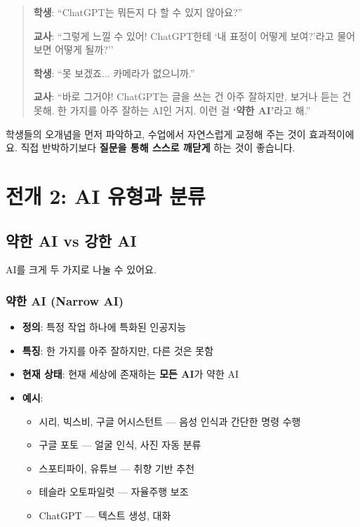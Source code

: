 \documentclass[11pt,a4paper]{article}
\begin{document}
\begin{quote}
 \textbf{학생}: ``ChatGPT는 뭐든지 다 할 수 있지 않아요?''

 \textbf{교사}: ``그렇게 느낄 수 있어! ChatGPT한테 `내 표정이 어떻게 보여?'라고 물어보면 어떻게 될까?''

 \textbf{학생}: ``못 보겠죠... 카메라가 없으니까.''

 \textbf{교사}: ``바로 그거야! ChatGPT는 글을 쓰는 건 아주 잘하지만, 보거나 듣는 건 못해. 한 가지를 아주 잘하는 AI인 거지. 이런 걸 \textbf{`약한 AI'}라고 해.''
\end{quote}

\begin{tipbox}
학생들의 오개념을 먼저 파악하고, 수업에서 자연스럽게 교정해 주는 것이 효과적이에요. 직접 반박하기보다 \textbf{질문을 통해 스스로 깨닫게} 하는 것이 좋습니다.
\end{tipbox}



\section{ 전개 2: AI 유형과 분류}

\subsection{약한 AI vs 강한 AI}

AI를 크게 두 가지로 나눌 수 있어요.

\subsubsection{ 약한 AI (Narrow AI)}

\begin{itemize}[leftmargin=*]
    \item \textbf{정의}: 특정 작업 하나에 특화된 인공지능
    \item \textbf{특징}: 한 가지를 아주 잘하지만, 다른 것은 못함
    \item \textbf{현재 상태}: 현재 세상에 존재하는 \textbf{모든 AI}가 약한 AI
    \item \textbf{예시}:
    \begin{itemize}
        \item {} 시리, 빅스비, 구글 어시스턴트 — 음성 인식과 간단한 명령 수행
        \item {} 구글 포토 — 얼굴 인식, 사진 자동 분류
        \item {} 스포티파이, 유튜브 — 취향 기반 추천
        \item {} 테슬라 오토파일럿 — 자율주행 보조
        \item {} ChatGPT — 텍스트 생성, 대화
    \end{itemize}
\end{itemize}
\end{document}
